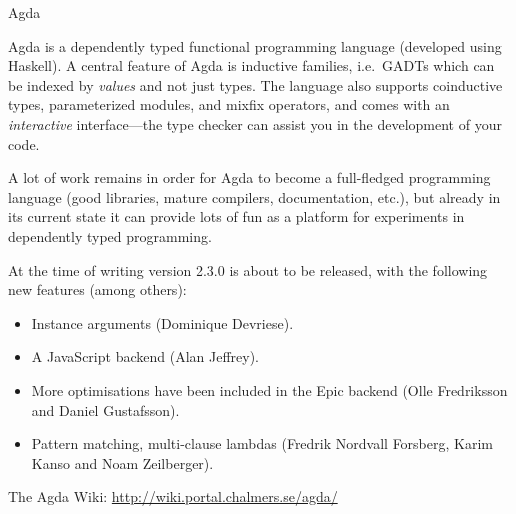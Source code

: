 \documentclass{article}
\begin{document}
\begin{hcarentry}{Agda}
\label{agda}
\makeheader

Agda is a dependently typed functional programming language (developed
using Haskell). A central feature of Agda is inductive families, i.e.\
GADTs which can be indexed by \emph{values} and not just types. The
language also supports coinductive types, parameterized modules, and
mixfix operators, and comes with an \emph{interactive} interface---the
type checker can assist you in the development of your code.

A lot of work remains in order for Agda to become a full-fledged
programming language (good libraries, mature compilers, documentation,
etc.), but already in its current state it can provide lots of fun as
a platform for experiments in dependently typed programming.

At the time of writing version 2.3.0 is about to be released, with the
following new features (among others):
\begin{itemize}
\item Instance arguments (Dominique Devriese).
\item A JavaScript backend (Alan Jeffrey).
\item More optimisations have been included in the Epic backend (Olle
  Fredriksson and Daniel Gustafsson).
\item Pattern matching, multi-clause lambdas (Fredrik Nordvall
  Forsberg, Karim Kanso and Noam Zeilberger).
\end{itemize}

\FurtherReading
  The Agda Wiki: \url{http://wiki.portal.chalmers.se/agda/}
\end{hcarentry}
\end{document}
